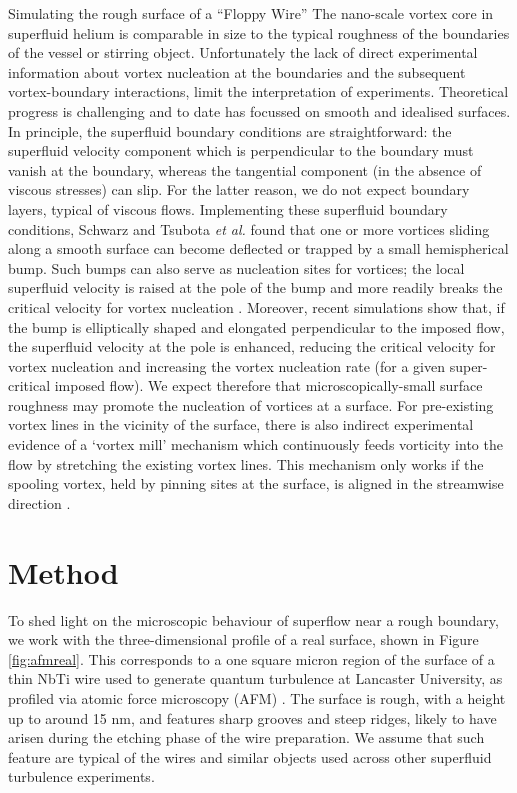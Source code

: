 \begin{chapter}{\label{cha:afm}Simulating the rough surface of a ``Floppy Wire''}
The nano-scale vortex core in superfluid helium is comparable in size 
to the typical roughness of the boundaries of the vessel or stirring object. 
Unfortunately the lack of direct experimental information about vortex 
nucleation at the boundaries and the subsequent vortex-boundary interactions,
limit the interpretation of experiments. Theoretical
progress is challenging and to date has focussed on smooth and idealised surfaces.  In principle, the superfluid boundary conditions
are straightforward:
the superfluid velocity
component which is perpendicular to the boundary must vanish
at the boundary, whereas the tangential component (in the absence of
viscous stresses) can slip.  For the latter reason, we do not expect boundary layers,
typical of viscous flows.   
Implementing these {superfluid} boundary conditions, 
Schwarz \cite{Schwarz-bump}
and Tsubota {\it et al.} \cite{PhysRevB.50.579}
found that one or more vortices sliding along a smooth surface
can become deflected or trapped by a small
hemispherical bump.  Such bumps can also serve as nucleation sites for vortices;  the local superfluid velocity is raised at the pole of the bump and more readily breaks the critical velocity for vortex nucleation \cite{win01}.  Moreover, recent simulations \cite{stagg_parker_14} show that, if
the bump is elliptically shaped and elongated perpendicular to the imposed flow, the superfluid velocity at the pole
is enhanced, reducing the critical velocity for vortex nucleation and increasing the vortex nucleation rate (for a given super-critical imposed flow). 
We expect therefore that microscopically-small surface roughness may promote the nucleation of vortices at a surface.
For pre-existing vortex lines in the vicinity of the surface, there is also indirect experimental evidence of a `vortex mill' mechanism 
which continuously feeds vorticity into the flow by stretching 
{the existing vortex} lines. This mechanism only works if the spooling vortex, 
held by pinning sites at the surface, is aligned in the streamwise direction \cite{PhysRevLett.64.1130}.

\section{Method\label{section:methodafm}}
To shed light on the microscopic behaviour of superflow near a rough
boundary, we work with the three-dimensional profile of a real surface, shown in Figure \ref{fig:afmreal}.  This corresponds to a one square micron region of the surface of a thin NbTi wire used to generate quantum turbulence at Lancaster University, as profiled via atomic force microscopy (AFM) \cite{Lawson}.  The surface is rough, with a height up to around 15 nm, and features sharp grooves and steep ridges, likely to have arisen during the etching phase of the wire preparation. We assume that such feature are typical of the wires and similar objects used across other superfluid turbulence experiments. 


\end{chapter}
